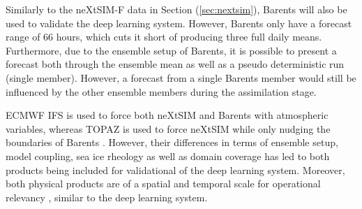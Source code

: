 \documentclass[../main/thesis.tex]{subfiles}
\begin{document}
Similarly to the neXtSIM-F data in Section (\ref{sec:nextsim}), Barents will also be used to validate the deep learning system. However, Barents only have a forecast range of 66 hours, which cuts it short of producing three full daily means. Furthermore, due to the ensemble setup of Barents, it is possible to present a forecast both through the ensemble mean as well as a pseudo deterministic run (single member). However, a forecast from a single Barents member would still be influenced by the other ensemble members during the assimilation stage. 

ECMWF IFS is used to force both neXtSIM and Barents with atmospheric variables, whereas TOPAZ \citep{Sakov2012} is used to force neXtSIM \citep{Williams2021} while only nudging the boundaries of Barents \citep{Roehrs2022}. However, their differences in terms of ensemble setup, model coupling, sea ice rheology as well as domain coverage has led to both products being included for validational of the deep learning system. Moreover, both physical products are of a spatial and temporal scale for operational relevancy \citep{Wagner2020}, similar to the deep learning system. 





\biblio
\end{document}
